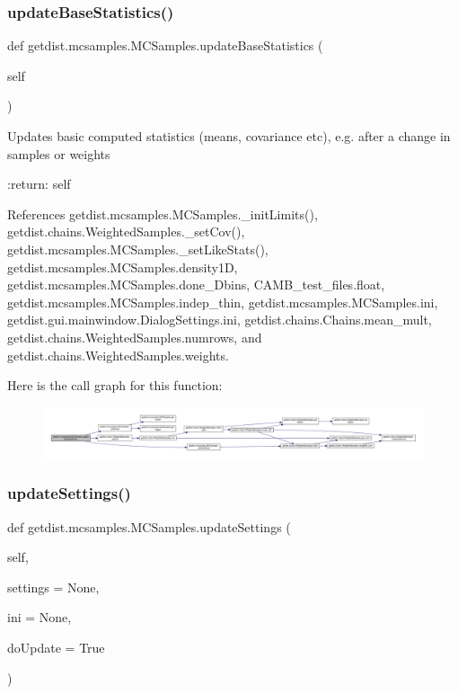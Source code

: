 \subsubsection{\texorpdfstring{update\+Base\+Statistics()}{updateBaseStatistics()}}
{\footnotesize\ttfamily def getdist.\+mcsamples.\+M\+C\+Samples.\+update\+Base\+Statistics (\begin{DoxyParamCaption}\item[{}]{self }\end{DoxyParamCaption})}

\begin{DoxyVerb}Updates basic computed statistics (means, covariance etc), e.g. after a change in samples or weights

:return: self
\end{DoxyVerb}
 

References getdist.\+mcsamples.\+M\+C\+Samples.\+\_\+init\+Limits(), getdist.\+chains.\+Weighted\+Samples.\+\_\+set\+Cov(), getdist.\+mcsamples.\+M\+C\+Samples.\+\_\+set\+Like\+Stats(), getdist.\+mcsamples.\+M\+C\+Samples.\+density1D, getdist.\+mcsamples.\+M\+C\+Samples.\+done\+\_\+Dbins, C\+A\+M\+B\+\_\+test\+\_\+files.\+float, getdist.\+mcsamples.\+M\+C\+Samples.\+indep\+\_\+thin, getdist.\+mcsamples.\+M\+C\+Samples.\+ini, getdist.\+gui.\+mainwindow.\+Dialog\+Settings.\+ini, getdist.\+chains.\+Chains.\+mean\+\_\+mult, getdist.\+chains.\+Weighted\+Samples.\+numrows, and getdist.\+chains.\+Weighted\+Samples.\+weights.

Here is the call graph for this function\+:
\nopagebreak
\begin{figure}[H]
\begin{center}
\leavevmode
\includegraphics[width=350pt]{classgetdist_1_1mcsamples_1_1MCSamples_aff509a0c9efdb8ea56bc44cf7d11c328_cgraph}
\end{center}
\end{figure}
\mbox{\label{classgetdist_1_1mcsamples_1_1MCSamples_a772230a5fe44bf20fbc220a44563ca1c}} 
\subsubsection{\texorpdfstring{update\+Settings()}{updateSettings()}}
{\footnotesize\ttfamily def getdist.\+mcsamples.\+M\+C\+Samples.\+update\+Settings (\begin{DoxyParamCaption}\item[{}]{self,  }\item[{}]{settings = {\ttfamily None},  }\item[{}]{ini = {\ttfamily None},  }\item[{}]{do\+Update = {\ttfamily True} }\end{DoxyParamCaption})}

